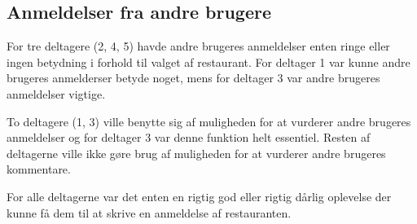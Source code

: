 \documentclass[a4paper, 12pt]{article}
\begin{document}
\subsection{Anmeldelser fra andre brugere}
For tre deltagere (2, 4, 5) havde andre brugeres anmeldelser enten
ringe eller ingen betydning i forhold til valget af restaurant. For
deltager 1 var kunne andre brugeres anmelderser betyde noget, mens for
deltager 3 var andre brugeres anmeldelser vigtige.



To deltagere (1, 3) ville benytte sig af muligheden for at vurderer
andre brugeres anmeldelser og for deltager 3 var denne funktion helt
essentiel. Resten af deltagerne ville ikke gøre brug af muligheden for
at vurderer andre brugeres kommentare.


For alle deltagerne var det enten en rigtig god eller rigtig dårlig
oplevelse der kunne få dem til at skrive en anmeldelse af
restauranten.

\end{document}
